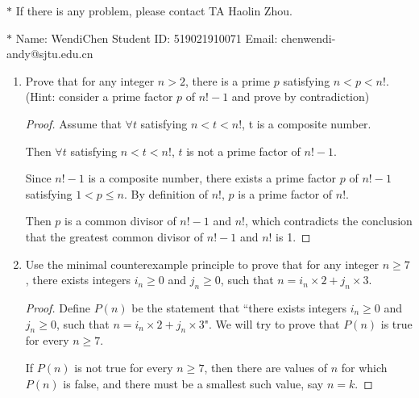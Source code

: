 \documentclass[12pt,a4paper]{article}
\theoremstyle{definition}
\begin{document}
\noindent

\noindent{}
\begin{center}
\footnotesize{\color{red}$*$ If there is any problem, please contact TA Haolin Zhou.}

\footnotesize{\color{blue}$*$ Name: WendiChen  \quad Student ID: 519021910071 \quad Email:  chenwendi-andy@sjtu.edu.cn}
\end{center}

\begin{enumerate}
    \item
    Prove that for any integer $n>2$, there is a prime $p$ satisfying $n<p<n!$. {\color{blue}(Hint: consider a prime factor $p$ of $n!-1$ and prove by contradiction)}
    \begin{proof}
        Assume that $\forall t$ satisfying $n<t<n!$, t is a composite number.
        
        Then $\forall t$ satisfying $n<t<n!$, $t$ is not a prime factor of $n!-1$.
        
        Since $n!-1$ is a composite number, there exists a prime factor $p$ of $n!-1$ satisfying $1<p\leqslant n$. By definition of $n!$, $p$ is a prime factor of $n!$.
        
        Then $p$ is a common divisor of $n!-1$ and $n!$, which contradicts the conclusion that the greatest common divisor of $n!-1$ and $n!$ is 1.
    \end{proof}

    \item
    Use the minimal counterexample principle to prove that for any integer $n\ge 7$, there exists integers $i_n\ge 0$ and $j_n\ge 0$, such that $n = i_n \times 2 + j_n \times 3$.
    \begin{proof}
        Define $P(n)$ be the statement that ``there exists integers $i_n\ge 0$ and $j_n\ge 0$, such that $n = i_n \times 2 + j_n \times 3$". We will try to prove that $P(n)$ is true for every $n\ge 7$.
        
        If $P(n)$ is not true for every $n\ge 7$, then there are values of $n$ for which $P(n)$ is false, and there must be a smallest such value, say $n = k$.
        

\end{proof}
\end{enumerate}
\end{document}
